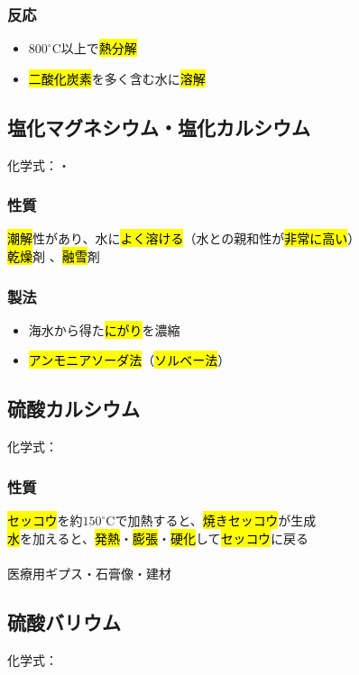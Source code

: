 \subsubsection{反応}
\begin{itemize}
    \item $800^{\circ}$C以上で\hl{熱分解}\\
    \item \hl{二酸化炭素}を多く含む水に\hl{溶解}\\
\end{itemize}
\subsection{塩化マグネシウム・塩化カルシウム}
化学式：\hl{}・\hl{}
\subsubsection{性質}
\hl{潮解}性があり、水に\hl{よく溶ける}（水との親和性が\hl{非常に高い}）\\
\hl{乾燥}剤 、\hl{融雪}剤
\subsubsection{製法}
\begin{itemize}
    \item 海水から得た\hl{にがり}を濃縮  \K
    \item \hl{アンモニアソーダ法}（\hl{ソルベー法}） \K
\end{itemize}
\subsection{硫酸カルシウム}
化学式：\hl{}
\subsubsection{性質}
\hl{セッコウ}を約$150^{\circ}$Cで加熱すると、\hl{焼きセッコウ}が生成\\
\hl{水}を加えると、\hl{発熱}・\hl{膨張}・\hl{硬化}して\hl{セッコウ}に戻る\\
\\
 医療用ギプス・石膏像・建材
\subsection{硫酸バリウム}
化学式：\hl{}
